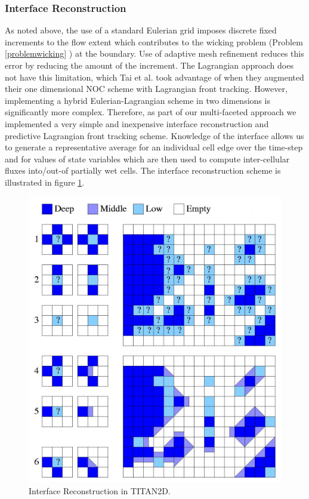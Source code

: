 \documentclass[letterpaper,10pt]{article}
\begin{document}
\subsubsection{Interface Reconstruction} \label{Interfacerecon}
As noted above, the use of a standard Eulerian grid imposes discrete 
fixed increments to the flow extent which contributes to the wicking problem
(Problem \ref{problemwicking} ) at the 
boundary.  Use of adaptive mesh refinement 
reduces this error by reducing the amount of the increment. 
The Lagrangian approach does not have this 
limitation, which Tai et al. \cite{Tai2002} took advantage
of when they augmented their one dimensional NOC scheme with 
Lagrangian front tracking.  However, implementing a hybrid 
Eulerian-Lagrangian scheme in two dimensions is significantly more 
complex. 
Therefore, as part of our multi-faceted approach we implemented a very 
simple and inexpensive interface reconstruction and predictive 
Lagrangian front tracking scheme.  Knowledge of the interface allows
us to generate a representative average for an individual cell edge 
over the time-step and for values of state variables which are then used to 
compute inter-cellular fluxes into/out-of partially wet cells.  The 
interface reconstruction scheme is illustrated in figure \ref{interface}.
\begin{figure}[!h]
        \centerline{\includegraphics[scale=0.3]{IMAGES/flux.png}}
        \caption{Interface Reconstruction in TITAN2D.}
        \label{interface}
\end{figure} 
\end{document}
